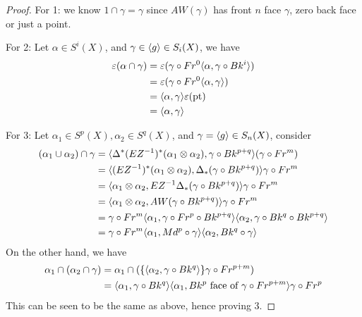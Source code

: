 \begin{proof}
    For 1: we know $1\cap\gamma=\gamma$ since $AW(\gamma)$ has front $n$ face $\gamma$, zero back face or just a point.

    For 2: Let $\alpha\in S^i(X)$, and $\gamma\in\langle g\rangle\in S_i(X)$, we have 
    \begin{align*}
        \varepsilon(\alpha\cap\gamma)&=\varepsilon(\gamma\circ Fr^0\langle\alpha,\gamma\circ Bk^i\rangle)\\
        &=\varepsilon(\gamma\circ Fr^0\langle\alpha,\gamma\rangle)\\
        &=\langle\alpha,\gamma\rangle\varepsilon(\text{pt})\\
        &=\langle\alpha,\gamma\rangle
    \end{align*}

    For 3: Let $\alpha_1\in S^p(X), \alpha_2\in S^q(X)$, and $\gamma=\langle g\rangle\in S_n(X)$, consider 
    \begin{align*}
        (\alpha_1\cup\alpha_2)\cap\gamma&=\langle\Delta^*(EZ^{-1})^*(\alpha_1\otimes\alpha_2),\gamma\circ Bk^{p+q}\rangle(\gamma\circ Fr^m)\\
        &=\langle(EZ^{-1})^*(\alpha_1\otimes\alpha_2),\Delta_*(\gamma\circ Bk^{p+q})\rangle \gamma\circ Fr^m\\
        &=\langle\alpha_1\otimes\alpha_2,EZ^{-1}\Delta_*(\gamma\circ Bk^{p+q})\rangle\gamma\circ Fr^m\\
        &=\langle\alpha_1\otimes\alpha_2,AW(\gamma\circ Bk^{p+q})\rangle \gamma\circ Fr^m\\
        &=\gamma\circ Fr^m\langle\alpha_1,\gamma\circ Fr^p\circ Bk^{p+q}\rangle\langle\alpha_2,\gamma\circ Bk^q\circ Bk^{p+q}\rangle\\
        &=\gamma\circ Fr^m\langle\alpha_1, Md^p\circ\gamma\rangle\langle\alpha_2,Bk^q\circ\gamma\rangle
    \end{align*}
    On the other hand, we have 
    \begin{align*}
        \alpha_1\cap(\alpha_2\cap\gamma)&=\alpha_1\cap(\{\langle\alpha_2,\gamma\circ Bk^q\rangle\}\gamma\circ Fr^{p+m})\\
        &=\langle\alpha_1,\gamma\circ Bk^q\rangle\langle\alpha_1,Bk^p \text{ face of } \gamma\circ Fr^{p+m}\rangle\gamma\circ Fr^p
    \end{align*}
    This can be seen to be the same as above, hence proving 3.


\end{proof}
